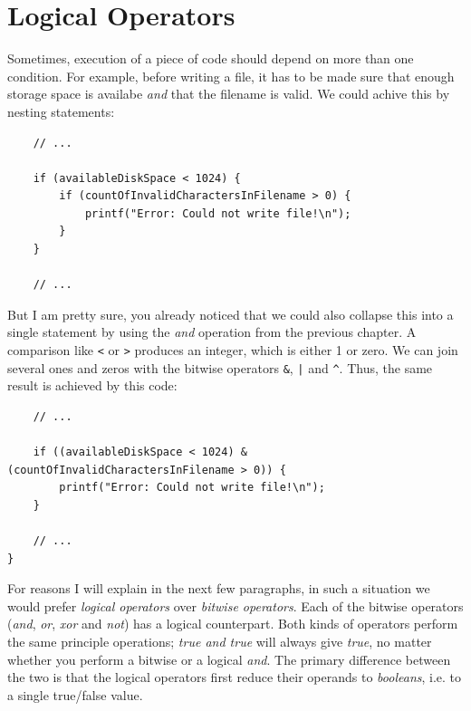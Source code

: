 \section{Logical Operators} \label{sec:OperatorsLogical}
Sometimes, execution of a piece of code should depend on more than one condition. For example, before writing a file, it has to be made sure that enough storage space is availabe \emph{and} that the filename is valid. We could achive this by nesting  statements:

\begin{codebox}[andNested.c]
\begin{verbatim}
    // ...
    
    if (availableDiskSpace < 1024) {
        if (countOfInvalidCharactersInFilename > 0) {
            printf("Error: Could not write file!\n");
        }
    }
    
    // ...
\end{verbatim}
\end{codebox}

But I am pretty sure, you already noticed that we could also collapse this into a single  statement by using the \emph{and} operation from the previous chapter. A comparison like \texttt{<} or \texttt{>} produces an integer, which is either 1 or zero. We can join several ones and zeros with the bitwise operators \texttt{\&}, \texttt{|} and \texttt{\textasciicircum}. Thus, the same result is achieved by this code:
\begin{codebox}[andBitwise.c]
\begin{verbatim}
    // ...
    
    if ((availableDiskSpace < 1024) & (countOfInvalidCharactersInFilename > 0)) {
        printf("Error: Could not write file!\n");
    }
    
    // ...
}
\end{verbatim}
 \label{code:bitwiseAndIf}
\end{codebox}

For reasons I will explain in the next few paragraphs, in such a situation we would prefer \emph{logical operators} over \emph{bitwise operators}. Each of the bitwise operators (\emph{and}, \emph{or}, \emph{xor} and \emph{not}) has a logical counterpart. Both kinds of operators perform the same principle operations; \emph{true and true} will always give \emph{true}, no matter whether you perform a bitwise or a logical \emph{and}. The primary difference between the two is that the logical operators first reduce their operands to \emph{booleans}, i.e. to a single true/false value.

